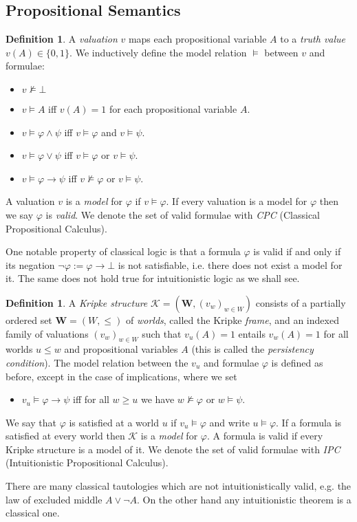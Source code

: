 \documentclass{easychair}
\theoremstyle{definition}
\theoremstyle{definition}
\theoremstyle{definition}
\theoremstyle{definition}
\theoremstyle{definition}
\newtheorem{definition}[theorem]{Definition}
\theoremstyle{definition}
\theoremstyle{definition}
\begin{document}
\subsection{Propositional Semantics}

\begin{definition}
	A \emph{valuation} $v$ maps each propositional variable $A$ to a \emph{truth value} $v(A)\in\{0, 1\}$. We inductively define the model relation $\models$ between $v$ and formulae:
	\begin{itemize}\addtolength{\itemsep}{-5pt}
		\item $v\not\models \bot$
		\item $v\models A$ iff $v(A) = 1$ for each propositional variable $A$.
		\item $v\models \varphi\wedge\psi$ iff $v\models\varphi$ and $v\models\psi$.
		\item $v\models\varphi\vee\psi$ iff $v\models\varphi$ or $v\models\psi$.
		\item $v\models\varphi\to \psi$ iff $v\not\models\varphi$ or $v\models\psi$.
	\end{itemize}
	A valuation $v$ is a \emph{model} for $\varphi$ if $v\models\varphi$. If every valuation is a model for $\varphi$ then we say $\varphi$ is \emph{valid}. We denote the set of valid formulae with \emph{CPC} (Classical Propositional Calculus).
\end{definition}

One notable property of classical logic is that a formula $\varphi$ is valid if and only if its negation $\neg\varphi := \varphi\to\bot$ is not satisfiable, i.e. there does not exist a model for it. The same does not hold true for intuitionistic logic as we shall see.
\pagebreak


\begin{definition}
	A \emph{Kripke structure}  $\mathcal K = (\mathbf W, (v_w)_{w\in W})$ consists of a partially ordered set $\mathbf W = (W, \leq)$ of \emph{worlds}, called the Kripke \emph{frame}, and an indexed family of valuations $(v_w)_{w\in W}$ such that $v_u(A) = 1$ entails $v_w(A) = 1$ for all worlds $u\leq w$ and propositional variables $A$ (this is called the \emph{persistency condition}).
	The model relation between the $v_u$ and formulae $\varphi$ is defined as before, except in the case of implications, where we set
	\begin{itemize}\addtolength{\itemsep}{-5pt}
		\item $v_u\models\varphi\to \psi$ iff for all $w\geq u$ we have $w\not\models\varphi$ or $w\models\psi$.
	\end{itemize}
	We say that $\varphi$ is satisfied at a world $u$ if $v_u\models\varphi$ and write $u\models\varphi$. If a formula is satisfied at every world then $\mathcal K$ is a \emph{model} for $\varphi$. A formula is valid if every Kripke structure is a model of it. We denote the set of valid formulae with \emph{IPC} (Intuitionistic Propositional Calculus).
\end{definition}
There are many classical tautologies which are not intuitionistically valid, e.g. the law of excluded middle $A\vee\neg A$. On the other hand any intuitionistic theorem is a classical one.
\end{document}
